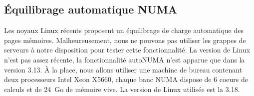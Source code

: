 \subsection{\'Equilibrage automatique NUMA}
Les noyaux Linux récents proposent un équilibrage de charge automatique des pages mémoires.
%
Malheureusement, nous ne pouvons pas utiliser les grappes de serveurs à notre disposition pour tester cette fonctionnalité.
%
La version de Linux n'est pas assez récente, la fonctionnalité autoNUMA n'est apparue que dans la version 3.13.
%
\`A la place, nous allons utiliser une machine de bureau contenant deux processeurs Intel Xeon X5660, chaque banc NUMA dispose de 6 coeurs de calculs et de 24~Go de mémoire vive.
%
La version de Linux utilisée est la 3.18.
%
